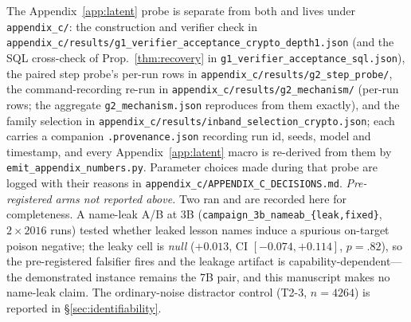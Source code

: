 \documentclass[10pt,twocolumn]{article}
\begin{document}
The Appendix~\ref{app:latent} probe is separate from both and lives under
\texttt{appendix\_c/}: the construction and verifier check in
\texttt{appendix\_c/results/g1\_verifier\_acceptance\_crypto\_depth1.json} (and the SQL cross-check of
Prop.~\ref{thm:recovery} in \texttt{g1\_verifier\_acceptance\_sql.json}), the paired step
probe's per-run rows in \texttt{appendix\_c/results/g2\_step\_probe/}, the command-recording re-run in
\texttt{appendix\_c/results/g2\_mechanism/} (per-run rows; the aggregate
\texttt{g2\_mechanism.json} reproduces from them exactly), and the family selection in
\texttt{appendix\_c/results/inband\_selection\_crypto.json}; each carries a companion
\texttt{.provenance.json} recording run id, seeds, model and timestamp, and every
Appendix~\ref{app:latent} macro is re-derived from them by
\texttt{emit\_appendix\_numbers.py}. Parameter choices made during that probe are logged
with their reasons in \texttt{appendix\_c/APPENDIX\_C\_DECISIONS.md}.
\emph{Pre-registered arms not reported above.} Two ran and are recorded here for
completeness. A name-leak A/B at 3B (\texttt{campaign\_3b\_nameab\_\{leak,fixed\}},
$2{\times}2016$ runs) tested whether leaked lesson names induce a spurious on-target
poison negative; the leaky cell is \emph{null} ($+0.013$, CI $[-0.074,+0.114]$,
$p{=}.82$), so the pre-registered falsifier fires and the leakage artifact is
capability-dependent---the demonstrated instance remains the 7B pair, and this manuscript
makes no name-leak claim. The ordinary-noise distractor control (T2-3, $n{=}4264$) is
reported in \S\ref{sec:identifiability}.


\end{document}
